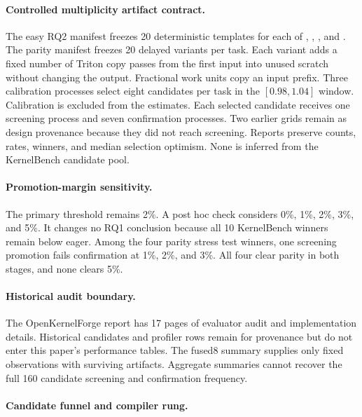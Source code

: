 \paragraph{Controlled multiplicity artifact contract.}

The easy RQ2 manifest freezes 20 deterministic templates for each of
, , , and
. The parity manifest freezes 20 delayed variants per task.
Each variant adds a fixed number of Triton copy passes from the first input into
unused scratch without changing the output. Fractional work units copy an input
prefix. Three calibration processes select eight candidates per task in the
$[0.98,1.04]$ window. Calibration is excluded from the estimates. Each selected
candidate receives one screening process and seven confirmation processes. Two
earlier grids remain as design provenance because they did not reach screening.
Reports preserve counts, rates, winners, and median selection optimism. None is
inferred from the KernelBench candidate pool.

\paragraph{Promotion-margin sensitivity.}

The primary threshold remains 2\%. A post hoc check considers 0\%, 1\%, 2\%,
3\%, and 5\%. It changes no RQ1 conclusion because all 10 KernelBench winners
remain below eager. Among the four parity stress test winners, one screening
promotion fails confirmation at 1\%, 2\%, and 3\%. All four clear parity in both
stages, and none clears 5\%.

\paragraph{Historical audit boundary.}

The OpenKernelForge report has 17 pages of evaluator audit and implementation
details. Historical candidates and profiler rows remain for provenance but do
not enter this paper's performance tables. The fused8 summary supplies only
fixed observations with surviving artifacts. Aggregate summaries cannot recover
the full 160 candidate screening and confirmation frequency.

\paragraph{Candidate funnel and compiler rung.}

